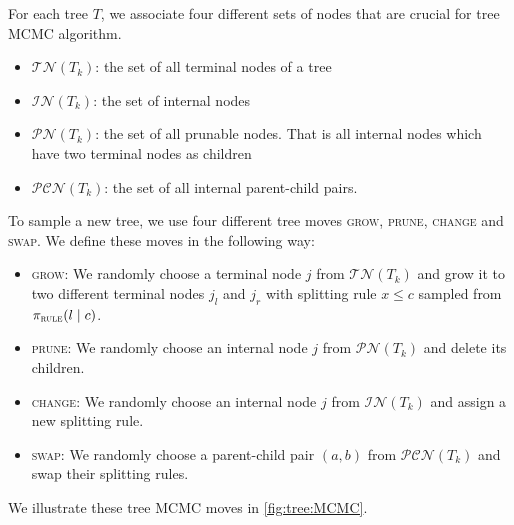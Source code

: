 \documentclass[
12pt]{article}
\begin{document}
For each tree $T$, we associate four different sets of nodes that are crucial for tree MCMC algorithm. 

\begin{itemize}
	\item $\mathcal{TN}(T_k)$: the set of all terminal nodes of a tree
	\item $\mathcal{IN}(T_k)$: the set of internal nodes
	\item $\mathcal{PN}(T_k)$: the set of all prunable nodes. That is all internal nodes which have two terminal nodes as children
	\item $\mathcal{PCN}(T_k)$: the set of all internal parent-child pairs.
\end{itemize}

To sample a new tree, we use four different tree moves \textsc{grow}, \textsc{prune}, \textsc{change} and \textsc{swap}. We define these moves in the following way:

\begin{itemize}
	\item \textsc{grow}: We randomly choose a terminal node $j$ from $\mathcal{TN}(T_k)$ and grow it to two different terminal nodes $j_l$ and $j_r$ with splitting rule $x\le c$ sampled from $\pi_{\textsc{rule}}(l\mid c)$. 
	\item \textsc{prune}: We randomly choose an internal node $j$ from $\mathcal{PN}(T_k)$ and delete its children.
	\item \textsc{change}: We randomly choose an internal node $j$ from $\mathcal{IN}(T_k)$ and assign a new splitting rule.
	\item \textsc{swap}: We randomly choose a parent-child pair $(a,b)$ from $\mathcal{PCN}(T_k)$ and swap their splitting rules.
\end{itemize}
We illustrate these tree MCMC moves in \cref{fig:tree:MCMC}.
\end{document}
